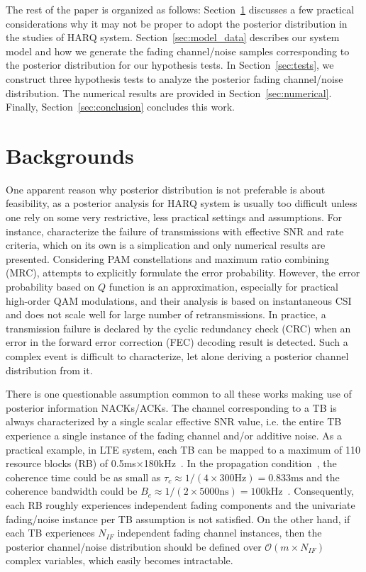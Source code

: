 \documentclass[journal,draftcls,onecolumn,12pt,twoside]{IEEEtran}
\begin{document}
The rest of the paper is organized as follows:
Section~\ref{sec:backgrounds} discusses a few
practical considerations why it may not be proper to adopt the posterior
distribution in the studies of HARQ system. Section~\ref{sec:model_data}
describes our system model and how we generate the fading channel/noise samples
corresponding to the posterior distribution for our hypothesis tests.
In Section~\ref{sec:tests}, we construct three hypothesis tests to analyze the
posterior fading channel/noise distribution. The numerical results are provided
in Section~\ref{sec:numerical}. Finally, Section~\ref{sec:conclusion} concludes
this work.


\section{Backgrounds}
\label{sec:backgrounds}

One apparent reason why posterior distribution is not preferable is about
feasibility, as a posterior analysis for HARQ system is usually too difficult
unless one rely on some very restrictive, less practical settings and
assumptions. For instance, \cite{gu2006modeling} characterize the failure of
transmissions with effective SNR and rate criteria, which on its own is a
simplication and only numerical results are presented. Considering PAM
constellations and maximum ratio combining (MRC),
\cite{long2012analysis}\cite{alkurd2015modeling} attempts to explicitly
formulate the error probability. However, the error probability based on $Q$
function is an approximation, especially for practical high-order QAM
modulations, and their analysis is based on instantaneous CSI and does not scale
well for large number of retransmissions. In practice, a transmission failure is
declared by the cyclic redundancy check (CRC) when an error in the forward error
correction (FEC) decoding result is detected. Such a complex event is difficult
to characterize, let alone deriving a posterior channel distribution from it.

There is one questionable assumption common to all these works making use of
posterior information NACKs/ACKs. The channel corresponding to a TB is always
characterized by a single scalar effective SNR value, i.e. the entire TB
experience a single instance of the fading channel and/or additive noise. As a
practical example, in LTE system, each TB can be mapped to a maximum of 110
resource blocks (RB) of 0.5ms$\times$180kHz~\cite[Table 7.1.7.2.1-1]{ts36.213}.
In the propagation condition~\cite[Table B.2-3]{ts36.141}, the coherence time
could be as small as $\tau_c\approx 1 / (4 \times 300\mbox{Hz}) =
0.833\mbox{ms}$ and the coherence bandwidth could be $B_c\approx 1 / (2 \times
5000\mbox{ns}) = 100\mbox{kHz}$~\cite[Table 2.1]{tse2005fundamentals}.
Consequently, each RB roughly experiences independent fading components and the
univariate fading/noise instance per TB assumption is not satisfied. On the
other hand, if each TB experiences $N_{IF}$ independent fading channel
instances, then the posterior channel/noise distribution should be defined over
$\mathcal{O}(m\times N_{IF})$ complex variables, which easily becomes
intractable.
\end{document}
